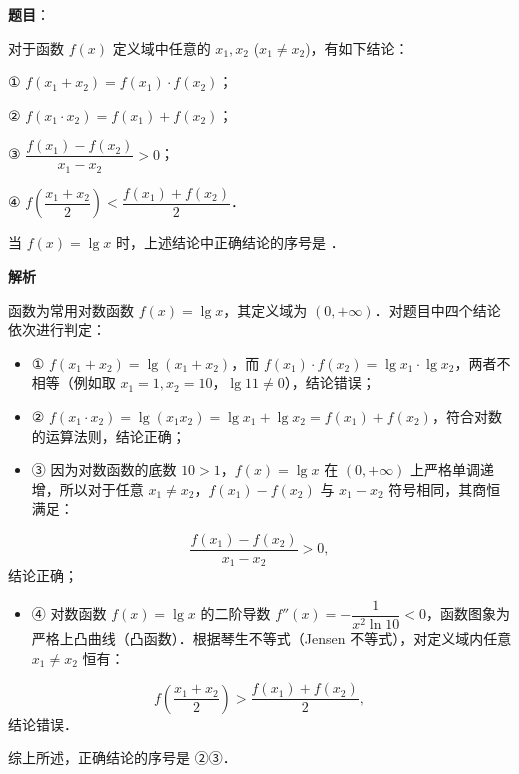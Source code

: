 \begin{answer}

\textbf{题目}：

对于函数 $f(x)$ 定义域中任意的 $x_1, x_2$ ($x_1 \neq x_2$)，有如下结论：

① $f(x_1 + x_2) = f(x_1) \cdot f(x_2)$；

② $f(x_1 \cdot x_2) = f(x_1) + f(x_2)$；

③ $\dfrac{f(x_1) - f(x_2)}{x_1 - x_2} > 0$；

④ $f\left(\dfrac{x_1 + x_2}{2}\right) < \dfrac{f(x_1) + f(x_2)}{2}$．

当 $f(x) = \lg x$ 时，上述结论中正确结论的序号是 \gkblank{}．

\textbf{解析}

函数为常用对数函数 $f(x) = \lg x$，其定义域为 $(0, +\infty)$．对题目中四个结论依次进行判定：
\begin{itemize}
\item ① $f(x_1 + x_2) = \lg(x_1 + x_2)$，而 $f(x_1) \cdot f(x_2) = \lg x_1 \cdot \lg x_2$，两者不相等（例如取 $x_1 = 1, x_2 = 10$，$\lg 11 \neq 0$），结论错误；
\item ② $f(x_1 \cdot x_2) = \lg(x_1 x_2) = \lg x_1 + \lg x_2 = f(x_1) + f(x_2)$，符合对数的运算法则，结论正确；
\item ③ 因为对数函数的底数 $10 > 1$，$f(x) = \lg x$ 在 $(0, +\infty)$ 上严格单调递增，所以对于任意 $x_1 \neq x_2$，$f(x_1) - f(x_2)$ 与 $x_1 - x_2$ 符号相同，其商恒满足：
\end{itemize}
\nopagebreak[4]
\[
\frac{f(x_1) - f(x_2)}{x_1 - x_2} > 0,
\]
  结论正确；
\begin{itemize}
\item ④ 对数函数 $f(x) = \lg x$ 的二阶导数 $f''(x) = -\dfrac{1}{x^2 \ln 10} < 0$，函数图象为严格上凸曲线（凸函数）．根据琴生不等式（Jensen 不等式），对定义域内任意 $x_1 \neq x_2$ 恒有：
\end{itemize}
\nopagebreak[4]
\[
f\left(\frac{x_1 + x_2}{2}\right) > \frac{f(x_1) + f(x_2)}{2},
\]
  结论错误．

综上所述，正确结论的序号是 ②③．


\end{answer}
